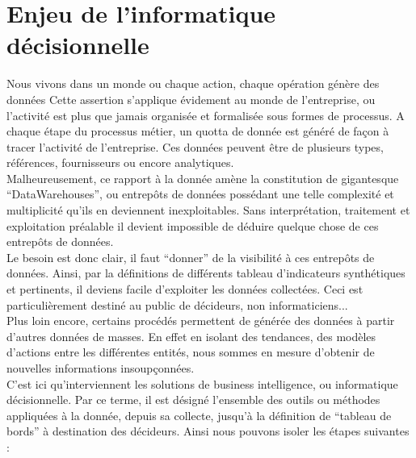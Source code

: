 \section{Enjeu de l'informatique décisionnelle}
Nous vivons dans un monde ou chaque action, chaque opération génère des données Cette assertion s'applique évidement au monde de l'entreprise, ou l’activité est plus que jamais organisée et formalisée sous formes de processus.
A chaque étape du processus métier, un quotta de donnée est généré de façon à tracer l’activité de l’entreprise. Ces données peuvent être de plusieurs types, références, fournisseurs ou encore analytiques.\\
Malheureusement, ce rapport à la donnée amène la constitution de gigantesque “DataWarehouses”, ou entrepôts de données possédant une telle complexité et multiplicité qu’ils en deviennent inexploitables. Sans interprétation, traitement et exploitation préalable il devient impossible de déduire quelque chose de ces entrepôts de données.\\
Le besoin est donc clair, il faut “donner” de la visibilité à ces entrepôts de données. Ainsi, par la définitions de différents tableau d’indicateurs synthétiques et pertinents, il deviens facile d’exploiter les données collectées. Ceci est particulièrement destiné au public de décideurs, non informaticiens... \\
Plus loin encore, certains procédés permettent de générée des données à partir d’autres données de masses. En effet en isolant des tendances, des modèles d’actions entre les différentes entités, nous sommes en mesure d'obtenir de nouvelles informations insoupçonnées.\\
C’est ici qu'interviennent les solutions de business intelligence, ou informatique décisionnelle. Par ce terme, il est désigné l'ensemble des outils ou méthodes appliquées à la donnée, depuis sa collecte, jusqu’à la définition de “tableau de bords” à destination des décideurs.
Ainsi nous pouvons isoler les étapes suivantes :
